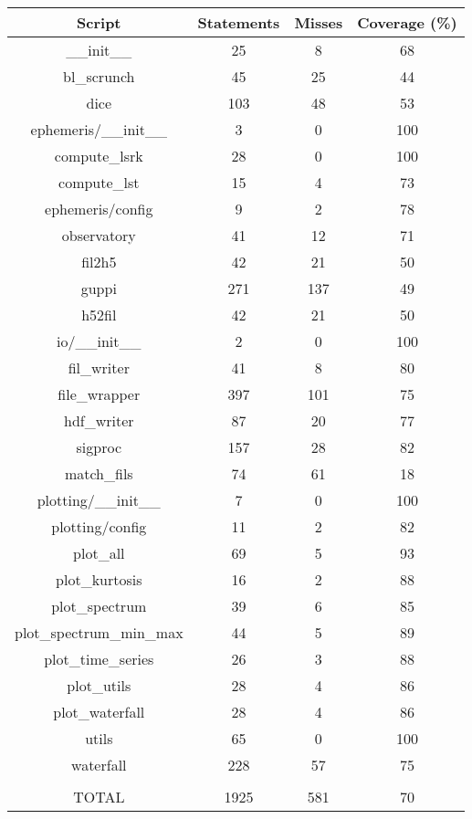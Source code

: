 \documentclass[12pt]{article}
\begin{document}
\begin{center}
 \begin{tabular}{||c c c c||} 
 \hline
 Script & Statements & Misses & Coverage (\%)\\ [0.5ex] 
 \hline
\_\_init\_\_ & 25 & 8 & 68 \\
\hline
bl\_scrunch & 45 & 25 & 44 \\
\hline
dice & 103 & 48 & 53 \\
\hline
ephemeris/\_\_init\_\_ & 3 & 0 & 100 \\
\hline
compute\_lsrk & 28 & 0 & 100 \\
\hline
compute\_lst & 15 & 4 & 73 \\
\hline
ephemeris/config & 9 & 2 & 78 \\
\hline
observatory & 41 & 12 & 71 \\
\hline
fil2h5 & 42 & 21 & 50 \\
\hline
guppi & 271 & 137 & 49 \\
\hline
h52fil & 42 & 21 & 50 \\
\hline
io/\_\_init\_\_ & 2 & 0 & 100 \\
\hline
fil\_writer & 41 & 8 & 80 \\
\hline
file\_wrapper & 397 & 101 & 75 \\
\hline
hdf\_writer & 87 & 20 & 77 \\
\hline
sigproc & 157 & 28 & 82 \\
\hline
match\_fils & 74 & 61 & 18 \\
\hline
plotting/\_\_init\_\_ & 7 & 0 & 100 \\
\hline
plotting/config & 11 & 2 & 82 \\
\hline
plot\_all & 69 & 5 & 93 \\
\hline
plot\_kurtosis & 16 & 2 & 88 \\
\hline
plot\_spectrum & 39 & 6 & 85 \\
\hline
plot\_spectrum\_min\_max & 44 & 5 & 89 \\
\hline
plot\_time\_series & 26 & 3 & 88 \\
\hline
plot\_utils & 28 & 4 & 86 \\
\hline
plot\_waterfall & 28 & 4 & 86 \\
\hline
utils & 65 & 0 & 100 \\
\hline
waterfall & 228 & 57 & 75 \\
\hline
&&&
\\
\hline
TOTAL & 1925 & 581 & 70 \\ [1ex] 
\hline
\end{tabular}


\end{center}
\end{document}
